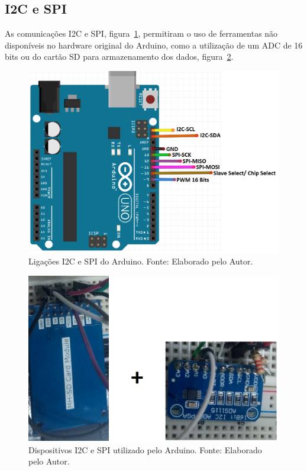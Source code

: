 \subsection{I2C e SPI}
As comunicações I2C e SPI, figura~\ref{fig:SPII2c}, permitiram o uso de ferramentas não disponíveis no hardware original do Arduino, como a utilização de um ADC de 16 bits ou do cartão SD para armazenamento dos dados, figura~\ref{fig:SDCard}.

\FloatBarrier
\begin{figure}[!htbp]
	\centering
	\includegraphics[scale=0.3]{imagens/ArduinoSPI_I2C.png}
	\caption{Ligações I2C e SPI do Arduino. Fonte: Elaborado pelo Autor. 	}
	\label{fig:SPII2c}
\end{figure}
\FloatBarrier

\FloatBarrier
\begin{figure}[!htbp]
	\centering
	\includegraphics[scale=0.3]{imagens/SdcardADS.jpg}
	\caption{Dispositivos I2C e SPI utilizado pelo Arduino. Fonte: Elaborado pelo Autor. 	}
	\label{fig:SDCard}
\end{figure}
\FloatBarrier


